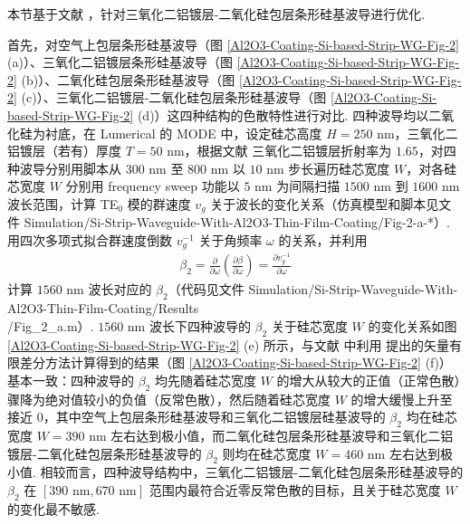 \documentclass[zh]{assignment}
\begin{document}
本节基于文献 \cite{guo2018experimentally}，针对三氧化二铝镀层-二氧化硅包层条形硅基波导进行优化.

首先，对空气上包层条形硅基波导（图 \ref{Al2O3-Coating-Si-based-Strip-WG-Fig-2} (a)）、三氧化二铝镀层条形硅基波导（图 \ref{Al2O3-Coating-Si-based-Strip-WG-Fig-2} (b)）、二氧化硅包层条形硅基波导（图 \ref{Al2O3-Coating-Si-based-Strip-WG-Fig-2} (c)）、三氧化二铝镀层-二氧化硅包层条形硅基波导（图 \ref{Al2O3-Coating-Si-based-Strip-WG-Fig-2} (d)）这四种结构的色散特性进行对比. 四种波导均以二氧化硅为衬底，在 Lumerical 的 MODE 中，设定硅芯高度 $H=250$ nm，三氧化二铝镀层（若有）厚度 $T=50$ nm，根据文献 \cite{boidin2016pulsed} 三氧化二铝镀层折射率为 $1.65$，对四种波导分别用脚本从 $300$ nm 至 $800$ nm 以 $10$ nm 步长遍历硅芯宽度 $W$，对各硅芯宽度 $W$ 分别用 frequency sweep 功能以 $5$ nm 为间隔扫描 $1500$ nm 到 $1600$ nm 波长范围，计算 TE$_0$ 模的群速度 $v_g$ 关于波长的变化关系（仿真模型和脚本见文件 Simulation/Si-Strip-Waveguide-With-Al2O3-Thin-Film-Coating/Fig-2-a-*）. 用四次多项式拟合群速度倒数 $v_g^{-1}$ 关于角频率 $\omega$ 的关系，并利用
\begin{align}
    \label{beta-2 calculate}
    \beta_2=\frac{\partial}{\partial\omega}\left(\frac{\partial\beta}{\partial\omega}\right)=\frac{\partial v_g^{-1}}{\partial\omega}
\end{align}
计算 $1560$ nm 波长对应的 $\beta_2$（代码见文件 Simulation/Si-Strip-Waveguide-With-Al2O3-Thin-Film-Coating/Results\\/Fig\_2\_a.m）. $1560$ nm 波长下四种波导的 $\beta_2$ 关于硅芯宽度 $W$ 的变化关系如图 \ref{Al2O3-Coating-Si-based-Strip-WG-Fig-2} (e) 所示，与文献 \cite{guo2018experimentally} 中利用 \cite{fallahkhair2008vector} 提出的矢量有限差分方法计算得到的结果（图 \ref{Al2O3-Coating-Si-based-Strip-WG-Fig-2} (f)）基本一致：四种波导的 $\beta_2$ 均先随着硅芯宽度 $W$ 的增大从较大的正值（正常色散）骤降为绝对值较小的负值（反常色散），然后随着硅芯宽度 $W$ 的增大缓慢上升至接近 $0$，其中空气上包层条形硅基波导和三氧化二铝镀层硅基波导的 $\beta_2$ 均在硅芯宽度 $W=390$ nm 左右达到极小值，而二氧化硅包层条形硅基波导和三氧化二铝镀层-二氧化硅包层条形硅基波导的 $\beta_2$ 则均在硅芯宽度 $W=460$ nm 左右达到极小值. 相较而言，四种波导结构中，三氧化二铝镀层-二氧化硅包层条形硅基波导的 $\beta_2$ 在 $[390\text{ nm},670\text{ nm}]$ 范围内最符合近零反常色散的目标，且关于硅芯宽度 $W$ 的变化最不敏感.
\end{document}
